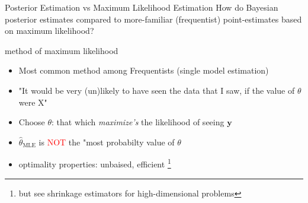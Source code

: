 \documentclass[presentation,9pt,xcolor=dvipsnames]{beamer}
\begin{document}
\begin{frame}[label={sec:org70018b0}]{Posterior Estimation vs Maximum Likelihood Estimation}
How do Bayesian posterior estimates compared to more-familiar (frequentist) point-estimates based on maximum likelihood?
\begin{block}{method of maximum likelihood}
\begin{itemize}
\item Most common method among Frequentists (single model estimation)
\item "It would be very (un)likely to have seen the data that I saw, if the value of \(\theta\) were X"
\item Choose \(\theta\): that which \emph{maximize's} the likelihood of seeing \(\mathbf{y}\)
\item \(\hat{\theta}_\text{MLE}\) is \textcolor{red}{NOT} the "most probabilty value of \(\theta\)
\item optimality properties: unbaised, efficient \footnote{but see shrinkage estimators for high-dimensional problems}
\end{itemize}
\end{block}
\end{frame}
\end{document}

